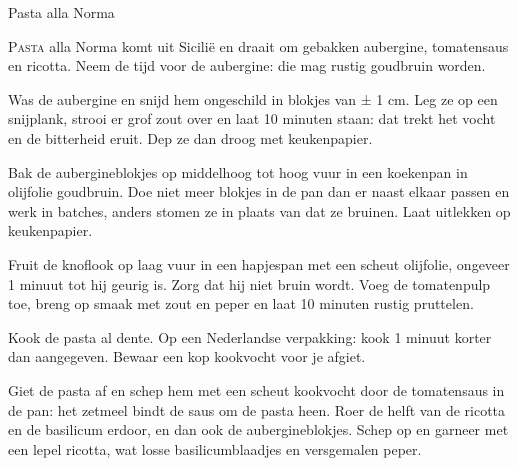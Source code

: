 \begin{recipe}{Pasta alla Norma}


\lettrine{P}{asta} alla Norma komt uit Sicilië en draait om gebakken aubergine,
tomatensaus en ricotta. Neem de tijd voor de aubergine: die mag rustig goudbruin
worden.

\begin{ingredients}
\end{ingredients}

\begin{steps}
  \item Was de aubergine en snijd hem ongeschild in blokjes van ± 1 cm. Leg ze op een
        snijplank, strooi er grof zout over en laat 10 minuten staan: dat trekt het
        vocht en de bitterheid eruit. Dep ze dan droog met keukenpapier.
  \item Bak de aubergineblokjes op middelhoog tot hoog vuur in een koekenpan in olijfolie
        goudbruin. Doe niet meer blokjes in de pan dan er naast elkaar passen en werk in
        batches, anders stomen ze in plaats van dat ze bruinen. Laat uitlekken op keukenpapier.
  \item Fruit de knoflook op laag vuur in een hapjespan met een scheut olijfolie,
        ongeveer 1 minuut tot hij geurig is. Zorg dat hij niet bruin wordt. Voeg
        de tomatenpulp toe, breng op smaak met zout en peper en laat 10 minuten
        rustig pruttelen.
  \item Kook de pasta al dente. Op een Nederlandse verpakking: kook 1 minuut korter
        dan aangegeven. Bewaar een kop kookvocht voor je afgiet.
  \item Giet de pasta af en schep hem met een scheut kookvocht door de tomatensaus
        in de pan: het zetmeel bindt de saus om de pasta heen. Roer de helft van de
        ricotta en de basilicum erdoor, en dan ook de aubergineblokjes. Schep op en
        garneer met een lepel ricotta, wat losse basilicumblaadjes en versgemalen peper.
\end{steps}
\end{recipe}
